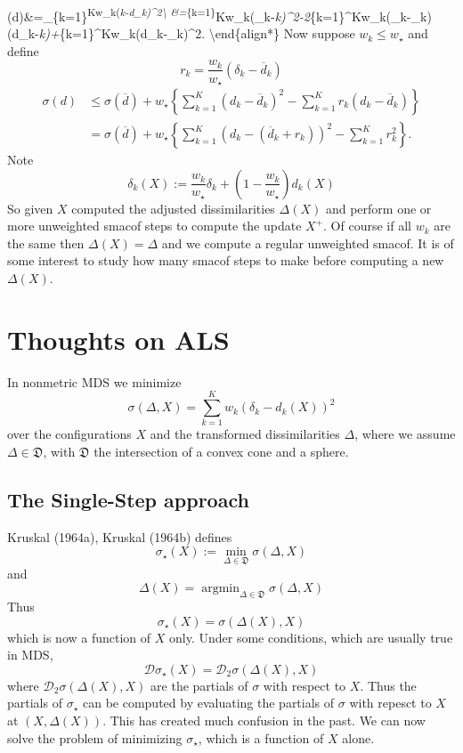 \documentclass[
  12pt,
]{article}
\begin{document}
\sigma(d)\&=\sum\_\{k=1\}\textsuperscript{Kw\_k(\delta\emph{k-d\_k)\^{}2\textbackslash{}
\&=\sum}\{k=1\}}Kw\_k(\delta\_k-\emph{k)\^{}2-2\sum}\{k=1\}\^{}Kw\_k(\delta\_k-\_k)(d\_k-\emph{k)+\sum}\{k=1\}\^{}Kw\_k(d\_k-\_k)\^{}2.
\textbackslash end\{align*\}
Now suppose \(w_k\leq w_\star\) and define
\[
r_k=\frac{w_k}{w_\star}(\delta_k-\overline{d}_k)
\]
\begin{align*}
\sigma(d)&\leq\sigma(\overline{d})+w_\star\left\{\sum_{k=1}^K(d_k-\overline{d}_k)^2-\sum_{k=1}^Kr_k(d_k-\overline{d}_k)\right\}\\&=\sigma(\overline{d})+w_\star\left\{\sum_{k=1}^K(d_k-(\overline{d}_k+r_k))^2-\sum_{k=1}^Kr_k^2\right\}.
\end{align*}
Note
\[
\delta_k(X):=\frac{w_k}{w_\star}\delta_k+(1-\frac{w_k}{w_\star})d_k(X)
\]
So given \(X\) computed the adjusted dissimilarities \(\Delta(X)\) and perform one or more unweighted smacof
steps to compute the update \(X^+\). Of course if all \(w_k\) are the same then \(\Delta(X)=\Delta\) and we
compute a regular unweighted smacof. It is of some interest to study how many smacof steps to make
before computing a new \(\Delta(X)\).

\section{Thoughts on ALS}\label{thoughts-on-als}

In nonmetric MDS we minimize
\[
\sigma(\Delta,X)=\sum_{k=1}^K w_k(\delta_k-d_k(X))^2
\]
over the configurations \(X\) and the transformed dissimilarities \(\Delta\),
where we assume \(\Delta\in\mathfrak{D}\), with \(\mathfrak{D}\) the intersection of
a convex cone and a sphere.

\subsection{The Single-Step approach}\label{the-single-step-approach}

Kruskal (1964a), Kruskal (1964b) defines
\[
\sigma_\star(X):=\min_{\Delta\in\mathfrak{D}}\sigma(\Delta,X)
\]
and
\[
\Delta(X)=\mathop{\text{argmin}}_{\Delta\in\mathfrak{D}}\sigma(\Delta,X)
\]
Thus
\[
\sigma_\star(X)=\sigma(\Delta(X),X)
\]
which is now a function of \(X\) only. Under some conditions, which are usually true in MDS,
\[
\mathcal{D}\sigma_\star(X)=\mathcal{D}_2\sigma(\Delta(X),X)
\]
where \(\mathcal{D}_2\sigma(\Delta(X),X)\) are the partials of \(\sigma\) with respect to \(X\).
Thus the partials of \(\sigma_\star\) can be computed by evaluating the partials of \(\sigma\)
with repesct to \(X\) at \((X,\Delta(X))\). This has created much confusion in the past. We can now solve the problem of minimizing \(\sigma_\star\), which is a function of \(X\) alone.
\end{document}
